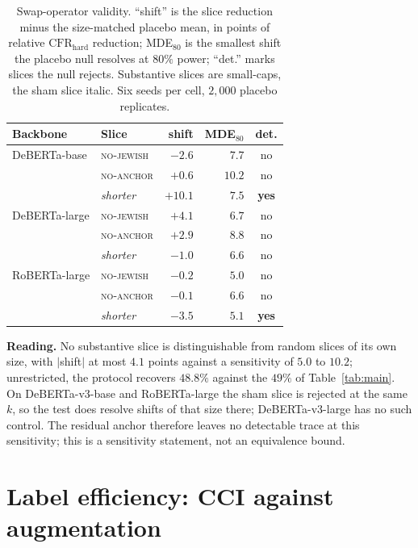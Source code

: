 \documentclass[11pt]{article}
\newcommand{\CFRh}{\ensuremath{\mathrm{CFR}_{\mathrm{hard}}}\xspace}
\begin{document}
\begin{table}[t]
\centering
\footnotesize
\setlength{\tabcolsep}{3.5pt}
\begin{tabular}{llrrc}
\toprule
Backbone & Slice & shift & MDE$_{80}$ & det. \\
\midrule
DeBERTa-base  & \textsc{no-jewish} & $-2.6$  & $7.7$  & no \\
              & \textsc{no-anchor} & $+0.6$  & $10.2$ & no \\
              & \emph{shorter}     & $+10.1$ & $7.5$  & \textbf{yes} \\
\addlinespace
DeBERTa-large & \textsc{no-jewish} & $+4.1$  & $6.7$  & no \\
              & \textsc{no-anchor} & $+2.9$  & $8.8$  & no \\
              & \emph{shorter}     & $-1.0$  & $6.6$  & no \\
\addlinespace
RoBERTa-large & \textsc{no-jewish} & $-0.2$  & $5.0$  & no \\
              & \textsc{no-anchor} & $-0.1$  & $6.6$  & no \\
              & \emph{shorter}     & $-3.5$  & $5.1$  & \textbf{yes} \\
\bottomrule
\end{tabular}
\caption{Swap-operator validity. ``shift'' is the slice reduction minus the
size-matched placebo mean, in points of relative \CFRh{} reduction; MDE$_{80}$ is
the smallest shift the placebo null resolves at $80\%$ power; ``det.'' marks
slices the null rejects. Substantive slices are small-caps, the sham slice
italic. Six seeds per cell, $2{,}000$ placebo replicates.}
\label{tab:validity}
\end{table}

\textbf{Reading.} No substantive slice is distinguishable from random slices of its own size, with $|$shift$|$ at most $4.1$ points against a sensitivity of $5.0$ to $10.2$; unrestricted, the protocol recovers $48.8\%$ against the $49\%$ of Table~\ref{tab:main}. On DeBERTa-v3-base and RoBERTa-large the sham slice is rejected at the same $k$, so the test does resolve shifts of that size there; DeBERTa-v3-large has no such control. The residual anchor therefore leaves no detectable trace at this sensitivity; this is a sensitivity statement, not an equivalence bound.

\FloatBarrier
\section{Label efficiency: CCI against augmentation}
\label{app:semisup}
\end{document}

